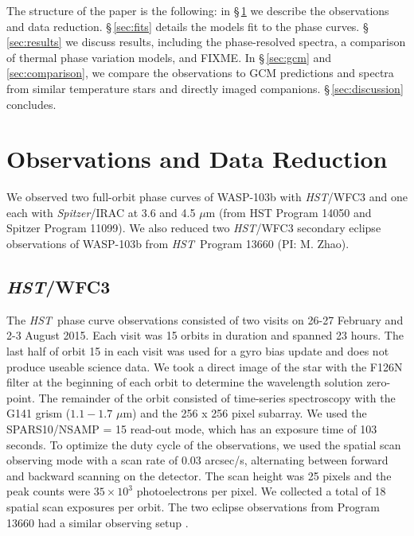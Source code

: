 \documentclass[twocolumn]{aastex61}
\newcommand{\project}[1]{\textsl{#1}}
\newcommand{\HST}{\project{HST}}
\newcommand{\Spitzer}{\project{Spitzer}}
\begin{document}
The structure of the paper is the following: in \S\,\ref{sec:observations} we describe the observations and data reduction. \S\,\ref{sec:fits} details the models fit to the phase curves. \S\,\ref{sec:results} we discuss results, including the phase-resolved spectra, a comparison of thermal phase variation models, and FIXME. In \S\,\ref{sec:gcm} and \ref{sec:comparison}, we compare the observations to GCM predictions and spectra from similar temperature stars and directly imaged companions. \S\,\ref{sec:discussion} concludes.




\section{Observations and Data Reduction}
\label{sec:observations}
We observed two full-orbit phase curves of WASP-103b with \HST/WFC3 and one each with \Spitzer/IRAC at 3.6 and 4.5 $\mu$m (from HST Program 14050 and Spitzer Program 11099). We also reduced two \HST/WFC3 secondary eclipse observations of WASP-103b from \HST\ Program 13660 (PI: M. Zhao).

\subsection{\HST/WFC3}
The \HST\ phase curve observations consisted of two visits on 26-27 February and 2-3 August 2015. Each visit was 15 orbits in duration and spanned 23 hours. The last half of orbit 15 in each visit was used for a gyro bias update and does not produce useable science data.  We took a direct image of the star with the F126N filter at the beginning of each orbit to determine the wavelength solution zero-point. The remainder of the orbit consisted of time-series spectroscopy with the G141 grism ($1.1 - 1.7$ $\mu$m) and the 256 x 256 pixel subarray. We used the SPARS10/NSAMP = 15 read-out mode, which has an exposure time of 103 seconds. To optimize the duty cycle of the observations, we used the spatial scan observing mode with a scan rate of 0.03 arcsec/s, alternating between forward and backward scanning on the detector. The scan height was 25 pixels and the peak counts were $35\times10^3$ photoelectrons per pixel. We collected a total of 18 spatial scan exposures per orbit.  The two eclipse observations from Program 13660 had a similar observing setup \citep[described in detail in][]{cartier17}.  
\end{document}
